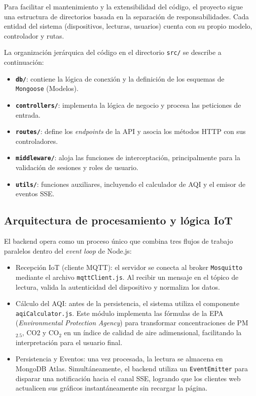 Para facilitar el mantenimiento y la extensibilidad del código, el proyecto sigue una estructura de directorios basada en la separación de responsabilidades. Cada entidad del sistema (dispositivos, lecturas, usuarios) cuenta con su propio modelo, controlador y rutas.

La organización jerárquica del código en el directorio \texttt{src/} se describe a continuación:

\begin{itemize}
    \item \textbf{\texttt{db/}}: contiene la lógica de conexión y la definición de los esquemas de \texttt{Mongoose} (Modelos).
    \item \textbf{\texttt{controllers/}}: implementa la lógica de negocio y procesa las peticiones de entrada.
    \item \textbf{\texttt{routes/}}: define los \textit{endpoints} de la API y asocia los métodos HTTP con sus controladores.
    \item \textbf{\texttt{middleware/}}: aloja las funciones de interceptación, principalmente para la validación de sesiones y roles de usuario.
    \item \textbf{\texttt{utils/}}: funciones auxiliares, incluyendo el calculador de AQI y el emisor de eventos SSE.
\end{itemize}

\subsection{Arquitectura de procesamiento y lógica IoT}

El backend opera como un proceso único que combina tres flujos de trabajo paralelos dentro del \textit{event loop} de Node.js:

\begin{itemize}
    \item Recepción IoT (cliente MQTT): el servidor se conecta al broker \texttt{Mosquitto} mediante el archivo \texttt{mqttClient.js}. Al recibir un mensaje en el tópico de lectura, valida la autenticidad del dispositivo y normaliza los datos.
    \item Cálculo del AQI: antes de la persistencia, el sistema utiliza el componente \texttt{aqiCalculator.js}. Este módulo implementa las fórmulas de la EPA (\textit{Environmental Protection Agency}) para transformar concentraciones de PM$_{2.5}$, CO2 y CO$_{2}$ en un índice de calidad de aire adimensional, facilitando la interpretación para el usuario final.
    \item Persistencia y Eventos: una vez procesada, la lectura se almacena en MongoDB Atlas. Simultáneamente, el backend utiliza un \texttt{EventEmitter} para disparar una notificación hacia el canal SSE, logrando que los clientes web actualicen sus gráficos instantáneamente sin recargar la página.
\end{itemize}

